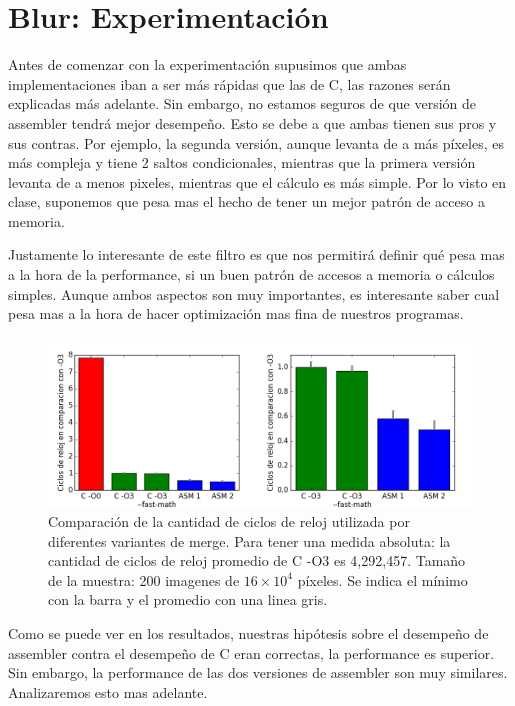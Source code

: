 \section*{Blur: Experimentación}

Antes de comenzar con la experimentación supusimos que ambas implementaciones iban a ser más rápidas que las de C, las razones serán explicadas más adelante. Sin embargo, no estamos seguros de que versión de assembler tendrá mejor desempeño.
Esto se debe a que ambas tienen sus pros y sus contras. Por ejemplo, la segunda versión, aunque levanta de a más píxeles, es más compleja y tiene 2 saltos condicionales, mientras que la primera versión levanta de a menos pixeles, mientras que el cálculo es más simple. Por lo visto en clase, suponemos que pesa mas el hecho de tener un mejor patrón de acceso a memoria.

Justamente lo interesante de este filtro es que nos permitirá definir qué pesa mas a la hora de la performance, si un buen patrón de accesos a memoria o cálculos simples. Aunque ambos aspectos son muy importantes, es interesante saber cual pesa mas a la hora de hacer optimización mas fina de nuestros programas.

\begin{figure}[!hbt] 
	\centering
  \includegraphics[width=20cm]{blur-all.png}
  \caption{Comparación de la cantidad de ciclos de reloj utilizada por diferentes variantes de merge. Para tener una medida absoluta: la cantidad de ciclos de reloj promedio de C -O3 es 4,292,457. Tamaño de la muestra: 200 imagenes de $16 \times 10^4$ píxeles. Se indica el mínimo con la barra y el promedio con una linea gris.}
\end{figure}

Como se puede ver en los resultados, nuestras hipótesis sobre el desempeño de assembler contra el desempeño de C eran correctas, la performance es superior. Sin embargo, la performance de las dos versiones de assembler son muy similares. Analizaremos esto mas adelante.


